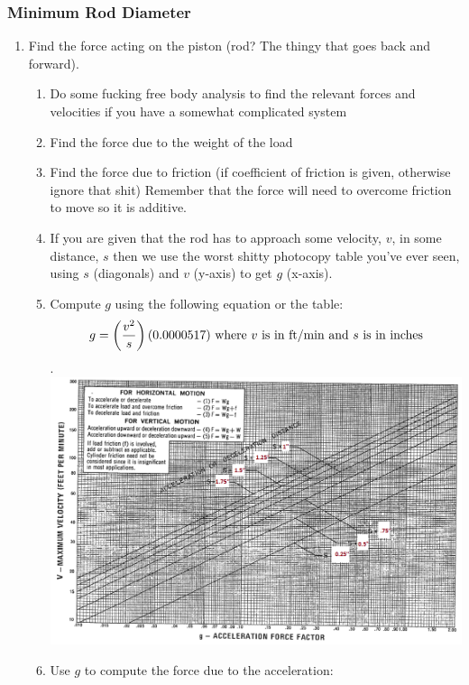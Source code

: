 \documentclass[11pt, fleqn]{article}
\begin{document}
\subsubsection{Minimum Rod Diameter}
\begin{enumerate}
    \item Find the force acting on the piston (rod? The thingy that goes back and forward).
    \begin{enumerate}
        \item Do some fucking free body analysis to find the relevant forces and velocities if you have a somewhat complicated system
        \item Find the force due to the weight of the load
        \item Find the force due to friction (if coefficient of friction is given, otherwise ignore that shit)  Remember that the force will need to overcome friction to move so it is additive.
        \item If you are given that the rod has to approach some velocity, $v$, in some distance, $s$ then we use the worst shitty photocopy table you've ever seen, using $s$ (diagonals) and $v$ (y-axis) to get $g$ (x-axis).\\
        \item Compute $g$ using the following equation or the table:
        \begin{align*}
            g=\left( \frac{v^2}{s} \right)(0.0000517) \text{ where $v$ is in $\mathrm{ft/min}$ and $s$ is in inches}
        \end{align*}
        .\hspace{-3cm}
        \includegraphics[scale=0.7]{Fluids/b2.png}
        \item Use $g$ to compute the force due to the acceleration:

\end{enumerate}
\end{enumerate}
\end{document}
